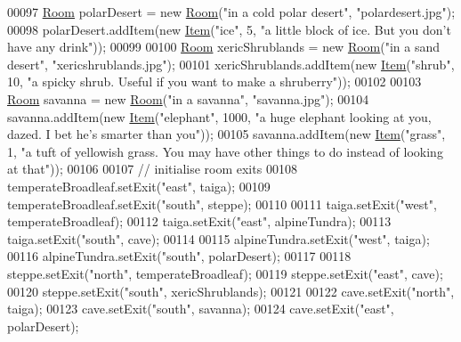 \begin{DoxyCode}
00097         \hyperlink{classRoom}{Room} polarDesert = \textcolor{keyword}{new} \hyperlink{classRoom}{Room}(\textcolor{stringliteral}{"in a cold polar desert"}, \textcolor{stringliteral}{"polardesert.jpg"});
00098         polarDesert.addItem(\textcolor{keyword}{new} \hyperlink{classItem}{Item}(\textcolor{stringliteral}{"ice"}, 5, \textcolor{stringliteral}{"a little block of ice. But you don't have any drink"}));
00099 
00100         \hyperlink{classRoom}{Room} xericShrublands = \textcolor{keyword}{new} \hyperlink{classRoom}{Room}(\textcolor{stringliteral}{"in a sand desert"}, \textcolor{stringliteral}{"xericshrublands.jpg"});
00101         xericShrublands.addItem(\textcolor{keyword}{new} \hyperlink{classItem}{Item}(\textcolor{stringliteral}{"shrub"}, 10, \textcolor{stringliteral}{"a spicky shrub. Useful if you want to make a
       shruberry"}));
00102 
00103         \hyperlink{classRoom}{Room} savanna = \textcolor{keyword}{new} \hyperlink{classRoom}{Room}(\textcolor{stringliteral}{"in a savanna"}, \textcolor{stringliteral}{"savanna.jpg"});
00104         savanna.addItem(\textcolor{keyword}{new} \hyperlink{classItem}{Item}(\textcolor{stringliteral}{"elephant"}, 1000, \textcolor{stringliteral}{"a huge elephant looking at you, dazed. I bet he's
       smarter than you"}));
00105         savanna.addItem(\textcolor{keyword}{new} \hyperlink{classItem}{Item}(\textcolor{stringliteral}{"grass"}, 1, \textcolor{stringliteral}{"a tuft of yellowish grass. You may have other things to
       do instead of looking at that"}));
00106 
00107         \textcolor{comment}{// initialise room exits}
00108         temperateBroadleaf.setExit(\textcolor{stringliteral}{"east"}, taiga);
00109         temperateBroadleaf.setExit(\textcolor{stringliteral}{"south"}, steppe);
00110 
00111         taiga.setExit(\textcolor{stringliteral}{"west"}, temperateBroadleaf);
00112         taiga.setExit(\textcolor{stringliteral}{"east"}, alpineTundra);
00113         taiga.setExit(\textcolor{stringliteral}{"south"}, cave);
00114 
00115         alpineTundra.setExit(\textcolor{stringliteral}{"west"}, taiga);
00116         alpineTundra.setExit(\textcolor{stringliteral}{"south"}, polarDesert);
00117 
00118         steppe.setExit(\textcolor{stringliteral}{"north"}, temperateBroadleaf);
00119         steppe.setExit(\textcolor{stringliteral}{"east"}, cave);
00120         steppe.setExit(\textcolor{stringliteral}{"south"}, xericShrublands);
00121 
00122         cave.setExit(\textcolor{stringliteral}{"north"}, taiga);
00123         cave.setExit(\textcolor{stringliteral}{"south"}, savanna);
00124         cave.setExit(\textcolor{stringliteral}{"east"}, polarDesert);

\end{DoxyCode}
